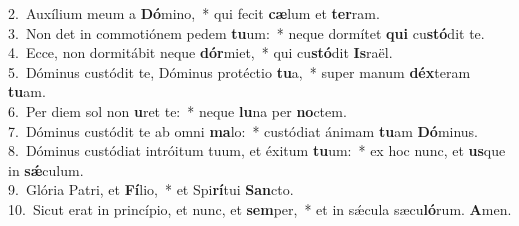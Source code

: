{2.~}Auxílium meum a \textbf{Dó}mino,~* qui fecit \textbf{cæ}lum et \textbf{ter}ram.\\
{3.~}Non det in commotiónem pedem \textbf{tu}um:~* neque dormítet \textbf{qui} cu\textbf{stó}dit te.\\
{4.~}Ecce, non dormitábit neque \textbf{dór}miet,~* qui cu\textbf{stó}dit \textbf{Is}raël.\\
{5.~}Dóminus custódit te, Dóminus protéctio \textbf{tu}a,~* super manum \textbf{déx}teram \textbf{tu}am.\\
{6.~}Per diem sol non \textbf{u}ret te:~* neque \textbf{lu}na per \textbf{no}ctem.\\
{7.~}Dóminus custódit te ab omni \textbf{ma}lo:~* custódiat ánimam \textbf{tu}am \textbf{Dó}minus.\\
{8.~}Dóminus custódiat intróitum tuum, et éxitum \textbf{tu}um:~* ex hoc nunc, et \textbf{us}que in \textbf{sǽ}culum.\\
{9.~}Glória Patri, et \textbf{Fí}lio,~* et Spi\textbf{rí}tui \textbf{San}cto.\\
{10.~}Sicut erat in princípio, et nunc, et \textbf{sem}per,~* et in sǽcula sæcu\textbf{ló}rum. \textbf{A}men.\\
